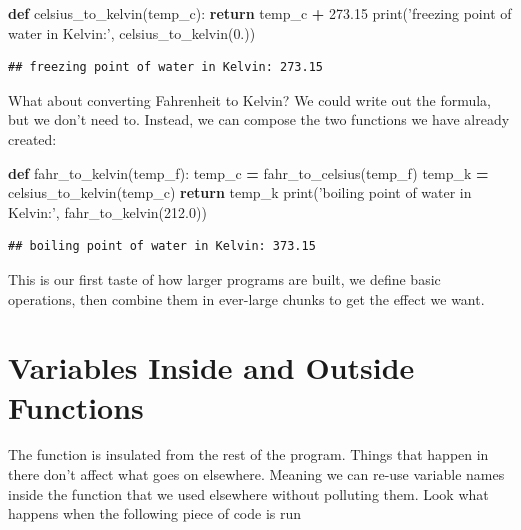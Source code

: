 \documentclass[]{book}
\newenvironment{Shaded}{\begin{snugshade}}{\end{snugshade}}
\newcommand{\BuiltInTok}[1]{#1}
\newcommand{\ControlFlowTok}[1]{\textcolor[rgb]{0.13,0.29,0.53}{\textbf{#1}}}
\newcommand{\FloatTok}[1]{\textcolor[rgb]{0.00,0.00,0.81}{#1}}
\newcommand{\KeywordTok}[1]{\textcolor[rgb]{0.13,0.29,0.53}{\textbf{#1}}}
\newcommand{\NormalTok}[1]{#1}
\newcommand{\OperatorTok}[1]{\textcolor[rgb]{0.81,0.36,0.00}{\textbf{#1}}}
\newcommand{\StringTok}[1]{\textcolor[rgb]{0.31,0.60,0.02}{#1}}
\theoremstyle{definition}
\theoremstyle{definition}
\theoremstyle{definition}
\theoremstyle{remark}
\begin{document}
\begin{Shaded}
\begin{Highlighting}[]
\KeywordTok{def}\NormalTok{ celsius_to_kelvin(temp_c):}
    \ControlFlowTok{return}\NormalTok{ temp_c }\OperatorTok{+} \FloatTok{273.15}
\BuiltInTok{print}\NormalTok{(}\StringTok{'freezing point of water in Kelvin:'}\NormalTok{, celsius_to_kelvin(}\FloatTok{0.}\NormalTok{))}
\end{Highlighting}
\end{Shaded}

\begin{verbatim}
## freezing point of water in Kelvin: 273.15
\end{verbatim}

What about converting Fahrenheit to Kelvin? We could write out the
formula, but we don't need to. Instead, we can compose the two functions
we have already created:

\begin{Shaded}
\begin{Highlighting}[]
\KeywordTok{def}\NormalTok{ fahr_to_kelvin(temp_f):}
\NormalTok{    temp_c }\OperatorTok{=}\NormalTok{ fahr_to_celsius(temp_f)}
\NormalTok{    temp_k }\OperatorTok{=}\NormalTok{ celsius_to_kelvin(temp_c)}
    \ControlFlowTok{return}\NormalTok{ temp_k}
\BuiltInTok{print}\NormalTok{(}\StringTok{'boiling point of water in Kelvin:'}\NormalTok{, fahr_to_kelvin(}\FloatTok{212.0}\NormalTok{))}
\end{Highlighting}
\end{Shaded}

\begin{verbatim}
## boiling point of water in Kelvin: 373.15
\end{verbatim}

This is our first taste of how larger programs are built, we define
basic operations, then combine them in ever-large chunks to get the
effect we want.

\hypertarget{variables-inside-and-outside-functions}{%
\section{Variables Inside and Outside
Functions}\label{variables-inside-and-outside-functions}}

The function is insulated from the rest of the program. Things that
happen in there don't affect what goes on elsewhere. Meaning we can
re-use variable names inside the function that we used elsewhere without
polluting them. Look what happens when the following piece of code is
run
\end{document}
